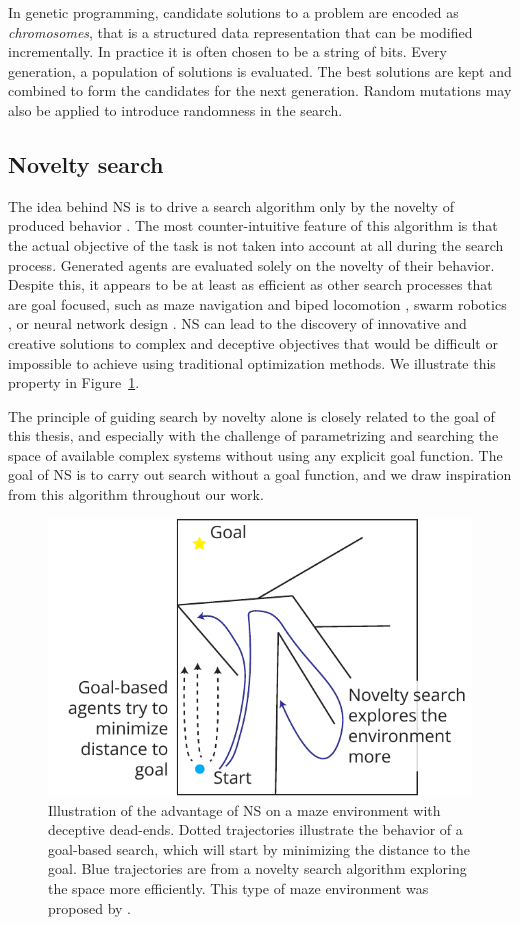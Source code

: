 In genetic programming, candidate solutions to a problem are encoded as
\emph{chromosomes}, that is a structured data representation that can be
modified incrementally. In practice it is often chosen to be a string of bits.
Every generation, a population of solutions is evaluated. The best solutions are
kept and combined to form the candidates for the next generation. Random
mutations may also be applied to introduce randomness in the search.

\subsection{Novelty search}
The idea behind \ac{NS} is to drive a search algorithm only by the novelty of
produced behavior \parencite{lehmanAbandoningObjectivesEvolution2011}. The most
counter-intuitive feature of this algorithm is that the actual objective of the
task is not taken into account at all during the search process. Generated
agents are evaluated solely on the novelty of their behavior. Despite this, it
appears to be at least as efficient as other search processes that are goal
focused, such as maze navigation and biped locomotion
\parencite{lehmanAbandoningObjectivesEvolution2011}, swarm robotics
\parencite{gomesEvolutionSwarmRobotics2013}, or neural network design
\parencite{risiEvolvingPlasticNeural2010}. \ac{NS} can lead to the discovery 
of innovative and creative solutions to complex and deceptive objectives that 
would be difficult or impossible to achieve using traditional optimization methods. 
We illustrate this property in Figure~\ref{fig:novelty_search}.

The principle of guiding search by novelty alone is closely related to the goal
of this thesis, and especially with the challenge of parametrizing and searching
the space of available complex systems without using any explicit goal function.
The goal of \ac{NS} is to carry out search without a goal function, and we draw
inspiration from this algorithm throughout our work.

\begin{figure}[htbp]
  \centering
  \includegraphics[width=.7\linewidth]{figures/novelty_search}
  \caption{Illustration of the advantage of \acf{NS} on a maze environment with
    deceptive dead-ends. Dotted trajectories illustrate the behavior of a
    goal-based search, which will start by minimizing the distance to the goal.
    Blue trajectories are from a novelty search algorithm exploring the space
    more efficiently. This type of maze environment was proposed by
    \textcite{lehmanAbandoningObjectivesEvolution2011}.}
\label{fig:novelty_search}
\end{figure}

